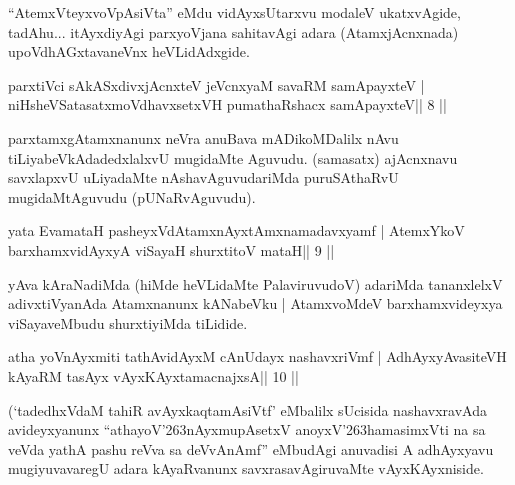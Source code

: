 \begin{artha}
``AtemxVteyxvoVpAsiVta'' eMdu vidAyxsUtarxvu modaleV ukatxvAgide, tadAhu... itAyxdiyAgi parxyoVjana sahitavAgi adara (AtamxjAcnxnada) upoVdhAGxtavaneVnx heVLidAdxgide.
\end{artha} 
 

\begin{shl}
parxtiVci sAkASxdivxjAcnxteV jeVcnxyaM savaRM samApayxteV |
niHsheVSatasatxmoVdhavxsetxVH pumathaRshacx samApayxteV\hfill || 8 ||
\end{shl}

\begin{artha}
parxtamxgAtamxnanunx neVra anuBava mADikoMDalilx nAvu tiLiyabeVkAdadedxlalxvU mugidaMte Aguvudu. (samasatx) ajAcnxnavu savxlapxvU uLiyadaMte nAshavAguvudariMda puruSAthaRvU mugidaMtAguvudu (pUNaRvAguvudu).
\end{artha}

\begin{shl}
yata EvamataH pasheyxVdAtamxnAyxtAmxnamadavxyamf |
AtemxYkoV barxhamxvidAyxyA viSayaH shurxtitoV mataH\hfill || 9 ||
\end{shl}

\begin{artha}
yAva kAraNadiMda (hiMde heVLidaMte PalaviruvudoV) adariMda tananxlelxV adivxtiVyanAda Atamxnanunx kANabeVku | AtamxvoMdeV barxhamxvideyxya viSayaveMbudu shurxtiyiMda tiLidide.
\end{artha} 
 
 

\begin{shl}
atha yoV\s nAyxmiti tathA\s vidAyxM cAnUdayx nashavxriVmf |
A\s dhAyxyAvasiteVH kAyaRM tasAyx vAyxKAyxtamacnajxsA\hfill || 10 ||
\end{shl}

\begin{artha}
(`tadedhxVdaM tahiR avAyxkaqtamAsiVtf' eMbalilx sUcisida nashavxravAda 
avideyxyanunx ``athayoV\char'263nAyxmupAsetxV anoyxV\char'263hamasimxVti na sa veVda yathA pashu reVva sa deVvAnAmf'' eMbudAgi anuvadisi A adhAyxyavu mugiyuvavaregU adara kAyaRvanunx savxrasavAgiruvaMte vAyxKAyxniside.
\end{artha} 
 
 
